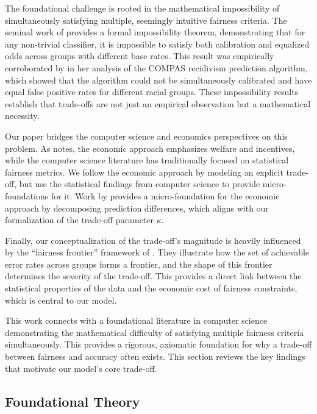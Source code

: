 \documentclass[12pt,a4paper]{article}
\theoremstyle{definition}
\theoremstyle{remark}
\begin{document}
The foundational challenge is rooted in the mathematical impossibility of simultaneously satisfying multiple, seemingly intuitive fairness criteria. The seminal work of \citet{Kleinberg2017} provides a formal impossibility theorem, demonstrating that for any non-trivial classifier, it is impossible to satisfy both calibration and equalized odds across groups with different base rates. This result was empirically corroborated by \citet{Chouldechova2017} in her analysis of the COMPAS recidivism prediction algorithm, which showed that the algorithm could not be simultaneously calibrated and have equal false positive rates for different racial groups. These impossibility results establish that trade-offs are not just an empirical observation but a mathematical necessity.

Our paper bridges the computer science and economics perspectives on this problem. As \citet{Gans2025} notes, the economic approach emphasizes welfare and incentives, while the computer science literature has traditionally focused on statistical fairness metrics. We follow the economic approach by modeling an explicit trade-off, but use the statistical findings from computer science to provide micro-foundations for it. Work by \citet{Rambachan2020} provides a micro-foundation for the economic approach by decomposing prediction differences, which aligns with our formalization of the trade-off parameter $\kappa$.

Finally, our conceptualization of the trade-off's magnitude is heavily influenced by the ``fairness frontier'' framework of \citet{Liang2025}. They illustrate how the set of achievable error rates across groups forms a frontier, and the shape of this frontier determines the severity of the trade-off. This provides a direct link between the statistical properties of the data and the economic cost of fairness constraints, which is central to our model.

This work connects with a foundational literature in computer science demonstrating the mathematical difficulty of satisfying multiple fairness criteria simultaneously. This provides a rigorous, axiomatic foundation for why a trade-off between fairness and accuracy often exists. This section reviews the key findings that motivate our model's core trade-off.

\subsection{Foundational Theory}
\end{document}
